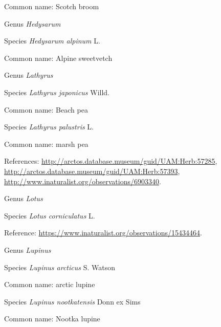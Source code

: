 \documentclass[9pt, article]{memoir}
\begin{document}
\begin{multicols}{2}
Common name: Scotch broom

\vspace{6pt}\noindent\hspace{30pt}Genus \textit{Hedysarum}


\vspace{6pt}\noindent\hspace{36pt}Species \textit{Hedysarum alpinum} L.


Common name: Alpine sweetvetch

\vspace{6pt}\noindent\hspace{30pt}Genus \textit{Lathyrus}


\vspace{6pt}\noindent\hspace{36pt}Species \textit{Lathyrus japonicus} Willd.


Common name: Beach pea

\vspace{6pt}\noindent\hspace{36pt}Species \textit{Lathyrus palustris} L.


Common name: marsh pea

References: 
\url{http://arctos.database.museum/guid/UAM:Herb:57285}, 
\url{http://arctos.database.museum/guid/UAM:Herb:57393}, 
\url{http://www.inaturalist.org/observations/6903340}.

\vspace{6pt}\noindent\hspace{30pt}Genus \textit{Lotus}


\vspace{6pt}\noindent\hspace{36pt}Species \textit{Lotus corniculatus} L.


Reference: 
\url{https://www.inaturalist.org/observations/15434464}.

\vspace{6pt}\noindent\hspace{30pt}Genus \textit{Lupinus}


\vspace{6pt}\noindent\hspace{36pt}Species \textit{Lupinus arcticus} S. Watson


Common name: arctic lupine

\vspace{6pt}\noindent\hspace{36pt}Species \textit{Lupinus nootkatensis} Donn ex Sims


Common name: Nootka lupine


\end{multicols}
\end{document}
